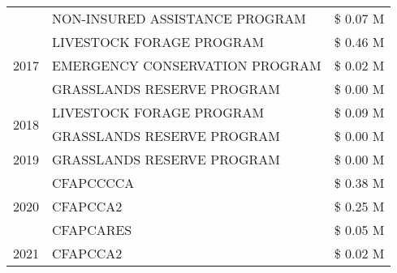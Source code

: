 \begin{tabular}{llr}
 & NON-INSURED ASSISTANCE PROGRAM                & \$ 0.07 M \\
\cline{1-3}
\multirow[t]{3}{*}{2017} & LIVESTOCK FORAGE PROGRAM & \$ 0.46 M \\
 & EMERGENCY CONSERVATION PROGRAM & \$ 0.02 M \\
 & GRASSLANDS RESERVE PROGRAM & \$ 0.00 M \\
\cline{1-3}
\multirow[t]{2}{*}{2018} & LIVESTOCK FORAGE PROGRAM & \$ 0.09 M \\
 & GRASSLANDS RESERVE PROGRAM & \$ 0.00 M \\
\cline{1-3}
2019 & GRASSLANDS RESERVE PROGRAM & \$ 0.00 M \\
\cline{1-3}
\multirow[t]{3}{*}{2020} & CFAPCCCCA & \$ 0.38 M \\
 & CFAPCCA2 & \$ 0.25 M \\
 & CFAPCARES & \$ 0.05 M \\
\cline{1-3}
2021 & CFAPCCA2 & \$ 0.02 M \\
\cline{1-3}
\bottomrule
\end{tabular}
